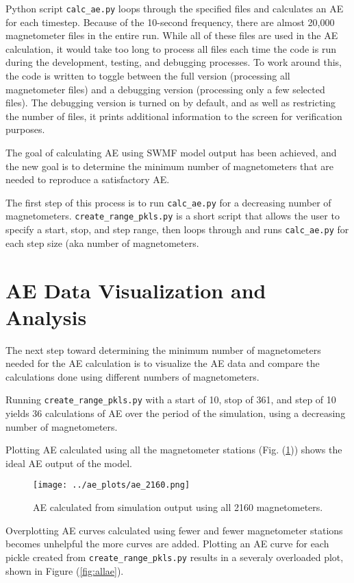\documentclass[12pt, letterpaper]{article}
\begin{document}
Python script \texttt{calc\_ae.py} loops through the specified files and calculates an AE for each timestep. Because of the 10-second frequency, there are almost 20,000 magnetometer files in the entire run. While all of these files are used in the AE calculation, it would take too long to process all files each time the code is run during the development, testing, and debugging processes. To work around this, the code is written to toggle between the full version (processing all magnetometer files) and a debugging version (processing only a few selected files). The debugging version is turned on by default, and as well as restricting the number of files, it prints additional information to the screen for verification purposes.

The goal of calculating AE using SWMF model output has been achieved, and the new goal is to determine the minimum number of magnetometers that are needed to reproduce a satisfactory AE.

The first step of this process is to run \texttt{calc\_ae.py} for a decreasing number of magnetometers. \texttt{create\_range\_pkls.py} is a short script that allows the user to specify a start, stop, and step range, then loops through and runs \texttt{calc\_ae.py} for each step size (aka number of magnetometers.


\section{AE Data Visualization and Analysis} \label{vis}

The next step toward determining the minimum number of magnetometers needed for the AE calculation is to visualize the AE data and compare the calculations done using different numbers of magnetometers.

Running \texttt{create\_range\_pkls.py} with a start of 10, stop of 361, and step of 10 yields 36 calculations of AE over the period of the simulation, using a decreasing number of magnetometers.

Plotting AE calculated using all the magnetometer stations (Fig. (\ref{fig:360})) shows the ideal AE output of the model.

\begin{figure}[!ht]
  \centering
  \texttt{[image: ../ae\_plots/ae\_2160.png]}
  \caption{AE calculated from simulation output using all 2160 magnetometers.}
  \label{fig:360}
\end{figure}

Overplotting AE curves calculated using fewer and fewer magnetometer stations becomes unhelpful the more curves are added. Plotting an AE curve for each pickle created from \texttt{create\_range\_pkls.py} results in a severaly overloaded plot, shown in Figure (\ref{fig:allae}).
\end{document}
